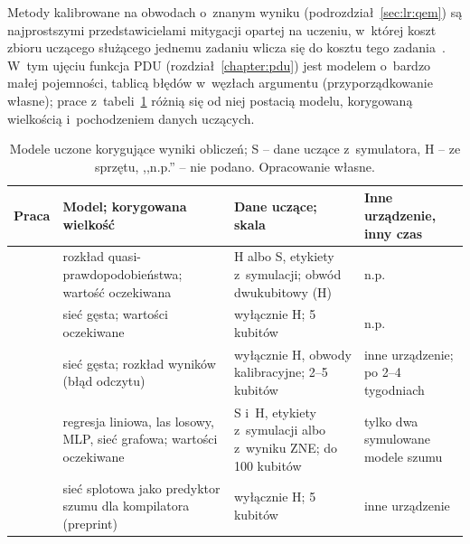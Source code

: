 Metody kalibrowane na obwodach o~znanym wyniku (podrozdział~\ref{sec:lr:qem}) są najprostszymi przedstawicielami mitygacji opartej na uczeniu, w~której koszt zbioru uczącego służącego jednemu zadaniu wlicza się do kosztu tego zadania~\cite{cai2023quantum}.
W~tym ujęciu funkcja PDU (rozdział~\ref{chapter:pdu}) jest modelem o~bardzo małej pojemności, tablicą błędów w~węzłach argumentu (przyporządkowanie własne); prace z~tabeli~\ref{tab:lr:ml:works} różnią się od niej postacią modelu, korygowaną wielkością i~pochodzeniem danych uczących.

\begin{table}[tb]
\centering
\caption[Prace o~korekcie wyników obliczeń kwantowych modelami uczonymi]{Modele uczone korygujące wyniki obliczeń; S -- dane uczące z~symulatora, H -- ze sprzętu, ,,n.p.'' -- nie podano. Opracowanie własne.}
\label{tab:lr:ml:works}
\footnotesize
\setlength{\tabcolsep}{3pt}
\newcommand{\lrc}[1]{\raggedright\hspace{0pt}#1}
\begin{tabular}{@{}p{1.1cm}p{5.6cm}p{5.2cm}p{3.2cm}@{}}
\toprule
\lrc{\textbf{Praca}} & \lrc{\textbf{Model; korygowana wielkość}} & \lrc{\textbf{Dane uczące; skala}} & \lrc{\textbf{Inne urządzenie, inny czas}} \tabularnewline
\midrule
\lrc{\cite{strikis_learning-based_2021}} & \lrc{rozkład quasi-prawdopodobieństwa; wartość oczekiwana} & \lrc{H albo S, etykiety z~symulacji; obwód dwukubitowy (H)} & \lrc{n.p.} \tabularnewline
\lrc{\cite{zhukov_quantum_2022}} & \lrc{sieć gęsta; wartości oczekiwane} & \lrc{wyłącznie H; 5 kubitów} & \lrc{n.p.} \tabularnewline
\lrc{\cite{kim_quantum_2022}} & \lrc{sieć gęsta; rozkład wyników (błąd odczytu)} & \lrc{wyłącznie H, obwody kalibracyjne; 2--5 kubitów} & \lrc{inne urządzenie; po 2--4 tygodniach} \tabularnewline
\lrc{\cite{liao_machine_2024}} & \lrc{regresja liniowa, las losowy, MLP, sieć grafowa; wartości oczekiwane} & \lrc{S i~H, etykiety z~symulacji albo z~wyniku ZNE; do 100 kubitów} & \lrc{tylko dwa symulowane modele szumu} \tabularnewline
\lrc{\cite{zlokapa_deep_2020}} & \lrc{sieć splotowa jako predyktor szumu dla kompilatora (preprint)} & \lrc{wyłącznie H; 5 kubitów} & \lrc{inne urządzenie} \tabularnewline
\bottomrule
\end{tabular}
\end{table}

